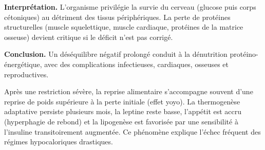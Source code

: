 \documentclass[11pt]{article}
\begin{document}
\textbf{Interprétation.} L'organisme privilégie la survie du cerveau (glucose puis corps cétoniques) au détriment des tissus périphériques. La perte de protéines structurelles (muscle squelettique, muscle cardiaque, protéines de la matrice osseuse) devient critique si le déficit n'est pas corrigé.

\textbf{Conclusion.} Un déséquilibre négatif prolongé conduit à la dénutrition protéino-énergétique, avec des complications infectieuses, cardiaques, osseuses et reproductives.

\begin{attention}
Après une restriction sévère, la reprise alimentaire s'accompagne souvent d'une reprise de poids supérieure à la perte initiale (effet yoyo). La thermogenèse adaptative persiste plusieurs mois, la leptine reste basse, l'appétit est accru (hyperphagie de rebond) et la lipogenèse est favorisée par une sensibilité à l'insuline transitoirement augmentée. Ce phénomène explique l'échec fréquent des régimes hypocaloriques drastiques.
\end{attention}
\end{document}
